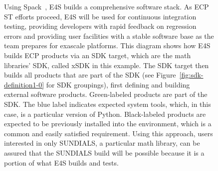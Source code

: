 \begin{figure}
		\centering
	\caption{Using Spack~\cite{gamblin+:ecp18-spack-tutorial}, E4S builds a comprehensive software stack.  As ECP ST efforts proceed, E4S will be used for continuous integration testing, providing developers with rapid feedback on regression errors and providing user facilities with a stable software base as the team prepares for exascale platforms.  This diagram shows how E4S builds ECP products via an SDK target, which are the math libraries' SDK, called xSDK in this example.  The SDK target then builds all products that are part of the SDK (see Figure~\ref{fig:sdk-definition1-0} for SDK groupings), first defining and building external software products. Green-labeled products are part of the SDK. The blue label indicates expected system tools, which, in this case, is a particular version of Python.  Black-labeled products are expected to be previously installed into the environment, which is a common and easily satisfied requirement.  Using this approach, users interested in only SUNDIALS, a particular math library, can be assured that the SUNDIALS build will be possible because it is a portion of what E4S builds and tests.}
	\label{fig:e4s-build-tree}
\end{figure}

